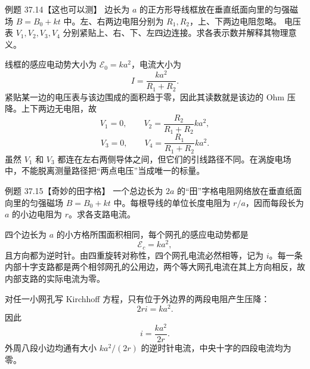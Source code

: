 \Needspace{0.12\textheight}
\begin{origexamplebox}{例题 37.14【这也可以测】}
边长为 $a$ 的正方形导线框放在垂直纸面向里的匀强磁场 $B=B_0+kt$ 中。左、右两边电阻分别为 $R_1,R_2$，上、下两边电阻忽略。
电压表 $V_1,V_2,V_3,V_4$ 分别紧贴上、右、下、左四边连接。求各表示数并解释其物理意义。
\end{origexamplebox}

\begin{xesolution}
线框的感应电动势大小为 $\mathcal E_0=ka^2$，电流大小为
\begin{equation}
  I=\frac{ka^2}{R_1+R_2}.
\end{equation}
紧贴某一边的电压表与该边围成的面积趋于零，因此其读数就是该边的 Ohm 压降。上下两边无电阻，故
\begin{equation}
  \boxed{V_1=0},
  \qquad
  \boxed{V_2=\frac{R_2}{R_1+R_2}ka^2},
\end{equation}
\begin{equation}
  \boxed{V_3=0},
  \qquad
  \boxed{V_4=\frac{R_1}{R_1+R_2}ka^2}.
\end{equation}
虽然 $V_1$ 和 $V_3$ 都连在左右两侧导体之间，但它们的引线路径不同。在涡旋电场中，不能脱离测量路径把“两点电压”当成唯一的标量。

\squareVoltmetersDiagram
\end{xesolution}

\Needspace{0.12\textheight}
\begin{origexamplebox}{例题 37.15【奇妙的田字格】}
一个总边长为 $2a$ 的“田”字格电阻网络放在垂直纸面向里的匀强磁场 $B=B_0+kt$ 中。每根导线的单位长度电阻为 $r/a$，因而每段长为 $a$ 的小边电阻为 $r$。求各支路电流。
\end{origexamplebox}

\begin{xesolution}
四个边长为 $a$ 的小方格所围面积相同，每个网孔的感应电动势都是
\begin{equation}
  \mathcal E_c=ka^2,
\end{equation}
且方向都为逆时针。由四重旋转对称性，四个网孔电流必然相等，记为 $i$。每一条内部十字支路都是两个相邻网孔的公用边，两个等大网孔电流在其上方向相反，故内部支路的实际电流为零。

对任一小网孔写 Kirchhoff 方程，只有位于外边界的两段电阻产生压降：
\begin{equation}
  2ri=ka^2.
\end{equation}
因此
\begin{equation}
  \boxed{i=\frac{ka^2}{2r}}.
\end{equation}
外周八段小边均通有大小 $ka^2/(2r)$ 的逆时针电流，中央十字的四段电流均为零。

\gridCurrentDiagram
\end{xesolution}

